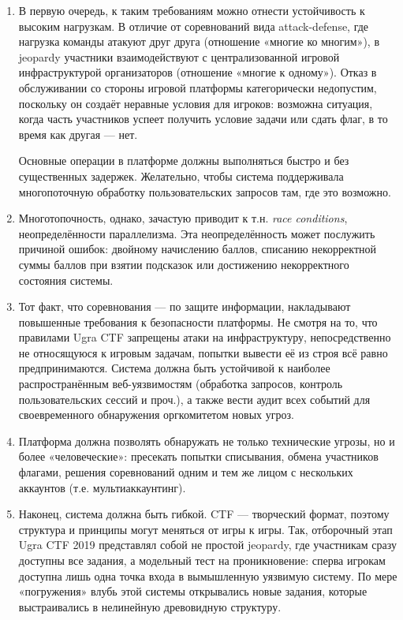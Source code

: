 \begin{enumerate}

\item
В первую очередь, к таким требованиям можно отнести устойчивость к высоким нагрузкам. В отличие от соревнований вида attack-defense, где нагрузка команды атакуют друг друга (отношение «многие ко многим»), в jeopardy участники взаимодействуют с централизованной игровой инфраструктурой организаторов (отношение «многие к одному»). Отказ в обслуживании со стороны игровой платформы категорически недопустим, поскольку он создаёт неравные условия для игроков: возможна ситуация, когда часть участников успеет получить условие задачи или сдать флаг, в то время как другая --- нет.

Основные операции в платформе должны выполняться быстро и без существенных задержек. Желательно, чтобы система поддерживала многопоточную обработку пользовательских запросов там, где это возможно.

\item
Многотопочность, однако, зачастую приводит к т.н. \textit{race conditions}, неопределённости параллелизма. Эта неопределённость может послужить причиной ошибок: двойному начислению баллов, списанию некорректной суммы баллов при взятии подсказок или достижению некорректного состояния системы.


\item
Тот факт, что соревнования --- по защите информации, накладывают повышенные требования к безопасности платформы. Не смотря на то, что правилами Ugra CTF запрещены атаки на инфраструктуру, непосредственно не относящуюся к игровым задачам, попытки вывести её из строя всё равно предпринимаются. Система должна быть устойчивой к наиболее распространённым веб-уязвимостям (обработка запросов, контроль пользовательских сессий и проч.), а также вести аудит всех событий для своевременного обнаружения оргкомитетом новых угроз.

\item
Платформа должна позволять обнаружать не только технические угрозы, но и более «человеческие»: пресекать попытки списывания, обмена участников флагами, решения соревнований одним и тем же лицом с нескольких аккаунтов (т.е. мультиаккаунтинг).

\item
Наконец, система должна быть гибкой. CTF --- творческий формат, поэтому структура и принципы могут меняться от игры к игры. Так, отборочный этап Ugra CTF 2019 представлял собой не простой jeopardy, где участникам сразу доступны все задания, а модельный тест на проникновение: сперва игрокам доступна лишь одна точка входа в вымышленную уязвимую систему. По мере «погружения» влубь этой системы открывались новые задания, которые выстраивались в нелинейную древовидную структуру\cite{UgraCTF19Q}.
\end{enumerate}


